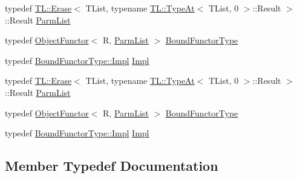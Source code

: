 \begin{DoxyCompactItemize}
\item 
typedef \mbox{\hyperlink{structUtil_1_1TL_1_1Erase}{T\+L\+::\+Erase}}$<$ T\+List, typename \mbox{\hyperlink{structUtil_1_1TL_1_1TypeAt}{T\+L\+::\+Type\+At}}$<$ T\+List, 0 $>$\+::Result $>$\+::Result \mbox{\hyperlink{structUtil_1_1Private_1_1BinderFirstTraits_3_01ObjectFunctor_3_01R_00_01TList_01_4_01_4_a181ef1a7b945beef449f25ba47f49bbc}{Parm\+List}}
\item 
typedef \mbox{\hyperlink{classUtil_1_1ObjectFunctor}{Object\+Functor}}$<$ R, \mbox{\hyperlink{structUtil_1_1Private_1_1BinderFirstTraits_3_01ObjectFunctor_3_01R_00_01TList_01_4_01_4_a181ef1a7b945beef449f25ba47f49bbc}{Parm\+List}} $>$ \mbox{\hyperlink{structUtil_1_1Private_1_1BinderFirstTraits_3_01ObjectFunctor_3_01R_00_01TList_01_4_01_4_af907df4f7fd610d891e8b4eabc0a7c39}{Bound\+Functor\+Type}}
\item 
typedef \mbox{\hyperlink{classUtil_1_1ObjectFunctor_a93fc635194d1d2768e73ba87d03abd8d}{Bound\+Functor\+Type\+::\+Impl}} \mbox{\hyperlink{structUtil_1_1Private_1_1BinderFirstTraits_3_01ObjectFunctor_3_01R_00_01TList_01_4_01_4_a44a122ba86e6d28d35849d5dbea18984}{Impl}}
\item 
typedef \mbox{\hyperlink{structUtil_1_1TL_1_1Erase}{T\+L\+::\+Erase}}$<$ T\+List, typename \mbox{\hyperlink{structUtil_1_1TL_1_1TypeAt}{T\+L\+::\+Type\+At}}$<$ T\+List, 0 $>$\+::Result $>$\+::Result \mbox{\hyperlink{structUtil_1_1Private_1_1BinderFirstTraits_3_01ObjectFunctor_3_01R_00_01TList_01_4_01_4_a181ef1a7b945beef449f25ba47f49bbc}{Parm\+List}}
\item 
typedef \mbox{\hyperlink{classUtil_1_1ObjectFunctor}{Object\+Functor}}$<$ R, \mbox{\hyperlink{structUtil_1_1Private_1_1BinderFirstTraits_3_01ObjectFunctor_3_01R_00_01TList_01_4_01_4_a181ef1a7b945beef449f25ba47f49bbc}{Parm\+List}} $>$ \mbox{\hyperlink{structUtil_1_1Private_1_1BinderFirstTraits_3_01ObjectFunctor_3_01R_00_01TList_01_4_01_4_af907df4f7fd610d891e8b4eabc0a7c39}{Bound\+Functor\+Type}}
\item 
typedef \mbox{\hyperlink{classUtil_1_1ObjectFunctor_a93fc635194d1d2768e73ba87d03abd8d}{Bound\+Functor\+Type\+::\+Impl}} \mbox{\hyperlink{structUtil_1_1Private_1_1BinderFirstTraits_3_01ObjectFunctor_3_01R_00_01TList_01_4_01_4_a44a122ba86e6d28d35849d5dbea18984}{Impl}}
\end{DoxyCompactItemize}


\subsection{Member Typedef Documentation}
\mbox{\label{structUtil_1_1Private_1_1BinderFirstTraits_3_01ObjectFunctor_3_01R_00_01TList_01_4_01_4_af907df4f7fd610d891e8b4eabc0a7c39}} 
